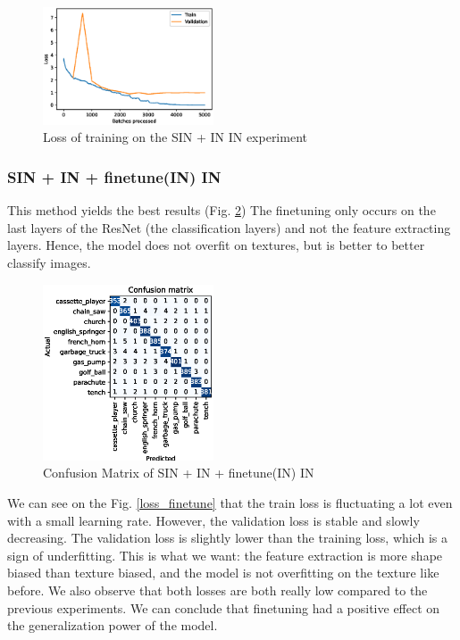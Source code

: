 \documentclass{article}
\begin{document}
\begin{figure}[h!]
  \includegraphics[width = 0.45\textwidth]{imgs/sinin/loss.eps}
  \caption{Loss of training on the SIN + IN \texorpdfstring{\textrightarrow} .IN experiment}
  \label{loss_sinin}
\end{figure}

\subsubsection{SIN + IN + finetune(IN) \texorpdfstring{\textrightarrow} .IN}

This method yields the best results (Fig. \ref{cm_sinin-in-finetune}) The finetuning only occurs
on the last layers of the ResNet (the classification layers) and not the feature extracting layers.
Hence, the model does not overfit on textures, but is better to better classify images.

\begin{figure}[h!]
  \includegraphics[width = 0.45\textwidth]{imgs/sinin/finetune/fine_tune_confusion_matrix_0.974.eps}
  \caption{Confusion Matrix of SIN + IN + finetune(IN) \texorpdfstring{\textrightarrow} .IN}
  \label{cm_sinin-in-finetune}
\end{figure}



We can see on the Fig. \ref{loss_finetune} that the train loss is fluctuating a lot even with a small
learning rate. However, the validation loss is stable and slowly decreasing.
The validation loss is slightly lower than the training loss, which is a sign of underfitting. This is what we want:
the feature extraction is more shape biased than texture biased, and the model is not overfitting on the texture like
before.
We also observe that both losses are both really low compared to the previous experiments. 
We can conclude that finetuning had a positive effect on the generalization power of the model.
\end{document}
